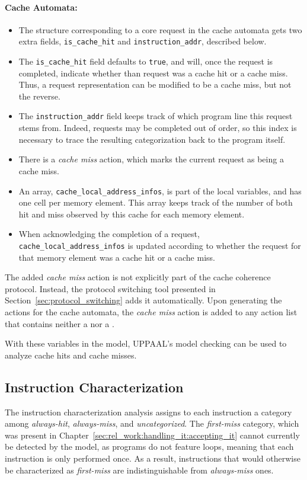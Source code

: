 \paragraph{Cache Automata:}
\begin{itemize}
\item
   The structure corresponding to a core request in the cache automata gets two
   extra fields, \lstinline!is_cache_hit! and \lstinline!instruction_addr!,
   described below.
\item
   The \lstinline!is_cache_hit! field defaults to \lstinline!true!, and will,
   once the request is completed, indicate whether than request was a cache hit
   or a cache miss. Thus, a request representation can be modified to be a
   cache miss, but not the reverse.
\item
   The \lstinline!instruction_addr! field keeps track of which program line this
   request stems from. Indeed, requests may be completed out of order, so this
   index is necessary to trace the resulting categorization back to the program
   itself.
\item
   There is a \textit{cache miss} action, which marks the current request as
   being a cache miss.
\item
   An array, \lstinline!cache_local_address_infos!, is part of the local
   variables, and has one cell per memory element. This array keeps track of the
   number of both hit and miss observed by this cache for each memory element.
\item
   When acknowledging the completion of a request,
   \lstinline!cache_local_address_infos! is updated according to whether the
   request for that memory element was a cache hit or a cache miss.
\end{itemize}

The added \textit{cache miss} action is not explicitly part of the cache
coherence protocol. Instead, the protocol switching tool presented in
Section~\ref{sec:protocol_switching} adds it automatically.
Upon generating the actions for the cache automata, the \textit{cache miss}
action is added to any action list that contains neither a \stallact{} nor
a \hitact{}.

With these variables in the model, UPPAAL's model checking can be used to
analyze cache hits and cache misses.

\subsection{Instruction Characterization}
\label{sec:analysis:instr_characterization}
The instruction characterization analysis assigns to each instruction a
category among \textit{always-hit}, \textit{always-miss}, and
\textit{uncategorized}. The \textit{first-miss} category, which was present in
Chapter~\ref{sec:rel_work:handling_it:accepting_it} cannot currently be
detected by the model, as programs do not feature loops, meaning that each
instruction is only performed once. As a result, instructions that would
otherwise be characterized as \textit{first-miss} are indistinguishable from
\textit{always-miss} ones.

